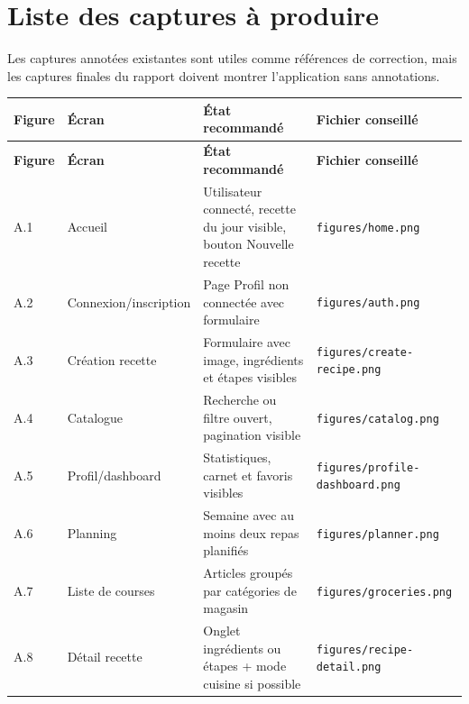 \documentclass[12pt,a4paper]{article}
\begin{document}
\section*{Liste des captures à produire}
Les captures annotées existantes sont utiles comme références de correction, mais les captures finales du rapport doivent montrer l'application sans annotations.
\begin{longtable}{p{1.5cm}p{4cm}p{6cm}p{4.5cm}}
\toprule
\textbf{Figure} & \textbf{Écran} & \textbf{État recommandé} & \textbf{Fichier conseillé} \\
\midrule
\endfirsthead
\toprule
\textbf{Figure} & \textbf{Écran} & \textbf{État recommandé} & \textbf{Fichier conseillé} \\
\midrule
\endhead
A.1 & Accueil & Utilisateur connecté, recette du jour visible, bouton Nouvelle recette & \texttt{figures/home.png} \\
A.2 & Connexion/inscription & Page Profil non connectée avec formulaire & \texttt{figures/auth.png} \\
A.3 & Création recette & Formulaire avec image, ingrédients et étapes visibles & \texttt{figures/create-recipe.png} \\
A.4 & Catalogue & Recherche ou filtre ouvert, pagination visible & \texttt{figures/catalog.png} \\
A.5 & Profil/dashboard & Statistiques, carnet et favoris visibles & \texttt{figures/profile-dashboard.png} \\
A.6 & Planning & Semaine avec au moins deux repas planifiés & \texttt{figures/planner.png} \\
A.7 & Liste de courses & Articles groupés par catégories de magasin & \texttt{figures/groceries.png} \\
A.8 & Détail recette & Onglet ingrédients ou étapes + mode cuisine si possible & \texttt{figures/recipe-detail.png} \\
\bottomrule
\end{longtable}
\end{document}
